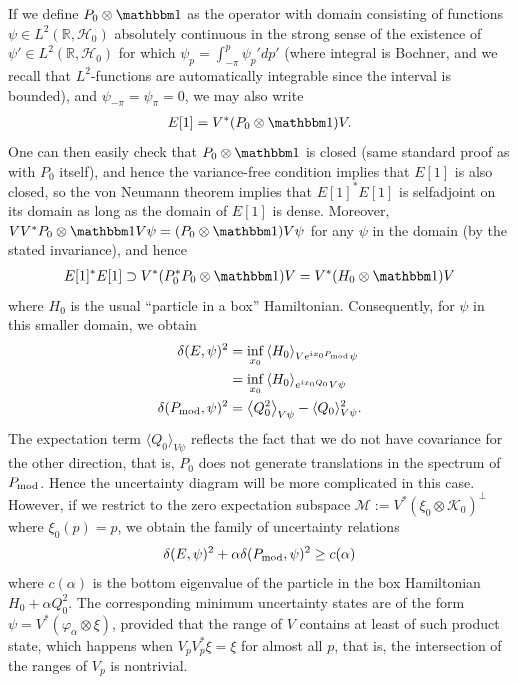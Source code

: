 If we define $P_0\otimes \id$ as the operator with domain consisting of functions $\psi\in L^2(\mathbb R,\mathcal H_0)$ absolutely continuous in the strong sense of the existence of $\psi'\in L^2(\mathbb R,\mathcal H_0)$ for which $\psi_p = \int_{-\pi}^p \psi_p'dp'$ (where integral is Bochner, and we recall that $L^2$-functions are automatically integrable since the interval is bounded), and $\psi_{-\pi}=\psi_\pi=0$, we may also write
\begin{align}
E[1] = V^* (P_0\otimes \id) V.
\end{align}
One can then easily check that $P_0\otimes \id$ is closed (same standard proof as with $P_0$ itself), and hence the variance-free condition implies that $E[1]$ is also closed, so the von Neumann theorem implies that $E[1]^*E[1]$ is selfadjoint on its domain as long as the domain of $E[1]$ is dense. Moreover, $VV^*P_0\otimes \id V\psi=(P_0\otimes \id) V\psi$ for any $\psi$ in the domain (by the stated invariance), and hence 
\begin{align}
  E[1]^*E[1]\supset V^*(P_0^*P_0\otimes \id)V = V^*(H_0\otimes \id)V
\end{align}
where $H_0$ is the usual ``particle in a box'' Hamiltonian. Consequently, for $\psi$ in this smaller domain, we obtain
\begin{align}
  \delta(E,\psi)^2 &= \inf_{x_0} \left\langle{H_0}\right\rangle_{Ve^{i x_0P_{\mathrm{mod}}}\psi}\\
                   &= \inf_{x_0} \left\langle{H_0}\right\rangle_{e^{i x_0 Q_0}V\psi}\\
  \delta(P_{\mathrm{mod}},\psi)^2 &= \left\langle{Q_0^2}\right\rangle_{V\psi} -\langle Q_0\rangle_{V\psi}^2.
\end{align}
The expectation term $\langle Q_0\rangle_{V\psi}$ reflects the fact that we do not have covariance for the other direction, that is, $P_0$ does not generate translations in the spectrum of $P_{\mathrm{mod}}$. Hence the uncertainty diagram will be more complicated in this case. However, if we restrict to the zero expectation subspace $\mathcal M := V^*(\xi_0\otimes \mathcal K_0)^\perp$ where
$\xi_0(p) =p$, we obtain the family of uncertainty relations
$$
\delta(E,\psi)^2+\alpha\delta(P_{\mathrm{mod}},\psi)^2\geq c(\alpha)
$$
where $c(\alpha)$ is the bottom eigenvalue of the particle in the box Hamiltonian $H_0+\alpha Q_0^2$. The corresponding minimum uncertainty states are of the form $\psi = V^*(\varphi_\alpha\otimes\xi)$, provided that the range of $V$ contains at least of such product state, which happens when $V_pV_p^*\xi =\xi$ for almost all $p$, that is, the intersection of the ranges of $V_p$ is nontrivial.

